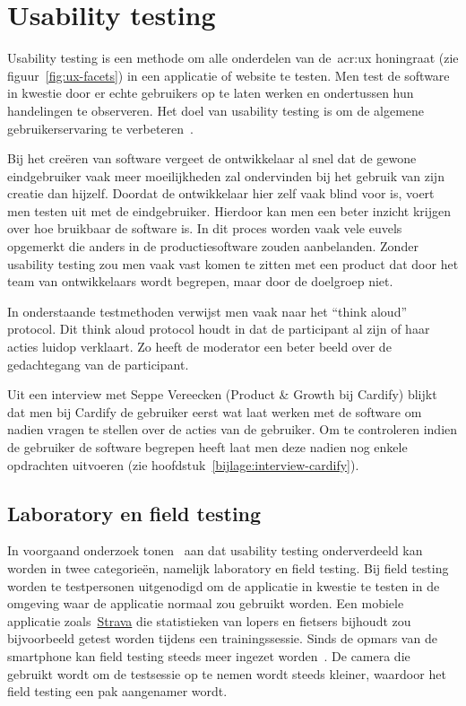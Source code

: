 \section{Usability testing}
\label{sec:usability-testing}

Usability testing is een methode om alle onderdelen van de~\acrlong{acr:ux} honingraat (zie figuur~\ref{fig:ux-facets}) in een applicatie of website te testen. Men test de software in kwestie door er echte gebruikers op te laten werken en ondertussen hun handelingen te observeren. Het doel van usability testing is om de algemene gebruikerservaring te verbeteren~\autocite{Hotjar2020}.

Bij het creëren van software vergeet de ontwikkelaar al snel dat de gewone eindgebruiker vaak meer moeilijkheden zal ondervinden bij het gebruik van zijn creatie dan hijzelf. Doordat de ontwikkelaar hier zelf vaak blind voor is, voert men testen uit met de eindgebruiker. Hierdoor kan men een beter inzicht krijgen over hoe bruikbaar de software is. In dit proces worden vaak vele euvels opgemerkt die anders in de productiesoftware zouden aanbelanden.
Zonder usability testing zou men vaak vast komen te zitten met een product dat door het team van ontwikkelaars wordt begrepen, maar door de doelgroep niet.

In onderstaande testmethoden verwijst men vaak naar het ``think aloud'' protocol. Dit think aloud protocol houdt in dat de participant al zijn of haar acties luidop verklaart. Zo heeft de moderator een beter beeld over de gedachtegang van de participant.

Uit een interview met Seppe Vereecken (Product \& Growth bij Cardify) blijkt dat men bij Cardify de gebruiker eerst wat laat werken met de software om nadien vragen te stellen over de acties van de gebruiker. Om te controleren indien de gebruiker de software begrepen heeft laat men deze nadien nog enkele opdrachten uitvoeren (zie hoofdstuk~\ref{bijlage:interview-cardify}).

\subsection{Laboratory en field testing}
\label{sec:usability-testing:lab-field-testing}

In voorgaand onderzoek tonen~\textcite{Kaikkonen2005} aan dat usability testing onderverdeeld kan worden in twee categorieën, namelijk laboratory en field testing. Bij field testing worden te testpersonen uitgenodigd om de applicatie in kwestie te testen in de omgeving waar de applicatie normaal zou gebruikt worden. Een mobiele applicatie zoals~\href{https://www.strava.com/}{Strava} die statistieken van lopers en fietsers bijhoudt zou bijvoorbeeld getest worden tijdens een trainingssessie. Sinds de opmars van de smartphone kan field testing steeds meer ingezet worden~\autocite{Kjeldskov2004}. De camera die gebruikt wordt om de testsessie op te nemen wordt steeds kleiner, waardoor het field testing een pak aangenamer wordt.

